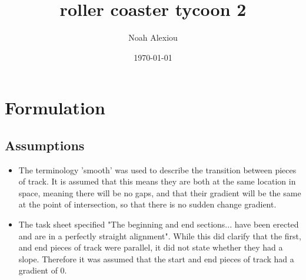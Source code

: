 \documentclass[11pt, letterpaper]{article}
\begin{document}
\begin{titlepage}
	\title{roller coaster tycoon 2}
	\author{Noah Alexiou}
	\date{\today}
	
	\maketitle
	\centering

	
\end{titlepage}


\newpage
\tableofcontents


\newpage


\section{Formulation}
\subsection{Assumptions}
\begin{itemize}
	\item The terminology 'smooth' was used to describe the transition between pieces of track. It is assumed that this means they are both at the same location in space, meaning there will be no gaps, and that their gradient will be the same at the point of intersection, so that there is no sudden change gradient.
	\item The task sheet specified "The beginning and end sections... have been erected and are in a perfectly straight alignment". While this did clarify that the first, and end pieces of track were parallel, it did not state whether they had a slope. Therefore it was assumed that the start and end pieces of track had a gradient of 0.
\end{itemize}
\end{document}

